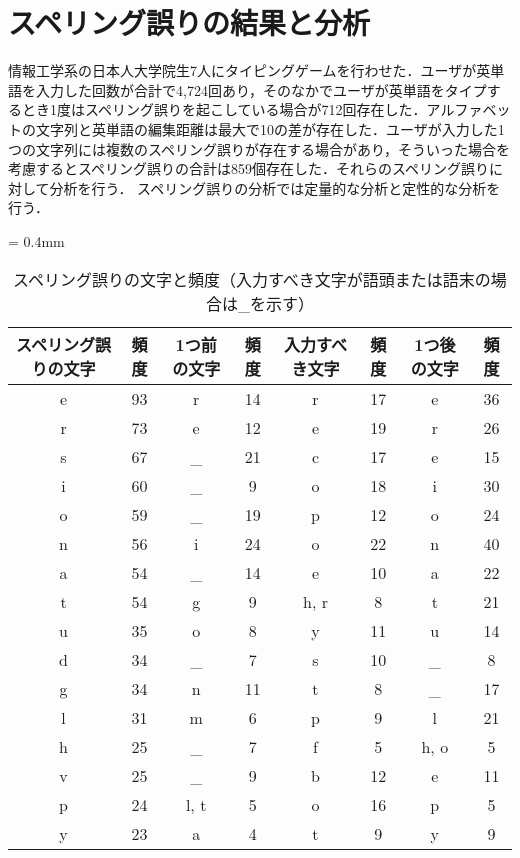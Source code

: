 \chapter{スペリング誤りの結果と分析}
情報工学系の日本人大学院生7人にタイピングゲームを行わせた．ユーザが英単語を入力した回数が合計で4,724回あり，そのなかでユーザが英単語をタイプするとき1度はスペリング誤りを起こしている場合が712回存在した．アルファベットの文字列と英単語の編集距離は最大で10の差が存在した．ユーザが入力した1つの文字列には複数のスペリング誤りが存在する場合があり，そういった場合を考慮するとスペリング誤りの合計は859個存在した．それらのスペリング誤りに対して分析を行う．
スペリング誤りの分析では定量的な分析と定性的な分析を行う．

{\tabcolsep = 0.4mm
 \begin{table*}[t]
  \small
  \begin{center}
   \caption{スペリング誤りの文字と頻度（入力すべき文字が語頭または語末の場合は\_を示す）}
   \begin{tabular}{|c|c|c|c|c|c|c|c|} \hline
       	スペリング誤りの文字 & 頻度 & 1つ前の文字 & 頻度 & 入力すべき文字 & 頻度 & 1つ後の文字 & 頻度\\ \hline
	    e & 93 & r & 14 & r & 17 & e & 36\\ \hline
	    r & 73 & e & 12 & e & 19 & r & 26\\ \hline
	    s & 67 & \_ & 21 & c & 17 & e & 15\\ \hline
	    i & 60 & \_ & 9 & o & 18 & i & 30\\ \hline
	    o & 59 & \_ & 19 & p & 12 & o & 24\\ \hline
	    n & 56 & i & 24 & o & 22 & n & 40\\ \hline
	    a & 54 & \_ & 14 & e & 10 & a & 22\\ \hline
	    t & 54 & g & 9 & h, r & 8 & t & 21\\ \hline
	    u & 35 & o & 8 & y & 11 & u & 14\\ \hline
	    d & 34 & \_ & 7 & s & 10 & \_ & 8\\ \hline
	    g & 34 & n & 11 & t & 8 & \_ & 17\\ \hline
	    l & 31 & m & 6 & p & 9 & l & 21\\ \hline
	    h & 25 & \_ & 7 & f & 5 & h, o & 5\\ \hline
	    v & 25 & \_ & 9 & b & 12 & e & 11\\ \hline
	    p & 24 & l, t & 5 & o & 16 & p & 5\\ \hline
	    y & 23 & a & 4 & t & 9 & y & 9\\ \hline

\end{tabular}
\end{center}
\end{table*}}
